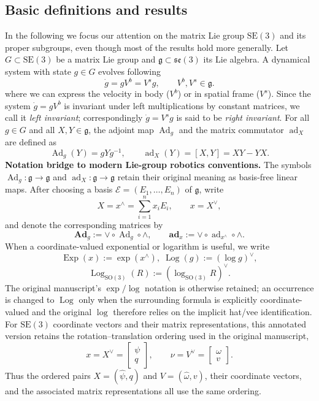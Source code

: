 \documentclass[10pt,twocolumn]{article}
\newenvironment{revision}{\color{red}}{}
\newcommand{\bAd}{\mathbf{Ad}}
\newcommand{\bad}{\mathbf{ad}}
\newcommand{\Exp}{\operatorname{Exp}}
\newcommand{\Log}{\operatorname{Log}}
\newcommand{\SO}{\mathrm{SO}}
\newcommand{\SE}{\mathrm{SE}}
\newcommand{\se}{\mathfrak{se}}
\newcommand{\gfrak}{\mathfrak g}
\newcommand{\Ad}{\operatorname{Ad}}
\newcommand{\ad}{\operatorname{ad}}
\begin{document}
\subsection{Basic definitions and results}\label{subsec:basic-definitions}
In the following we focus our attention on the matrix Lie group $\SE(3)$ and its proper subgroups, even though most of the results hold more generally. Let $G\subset\SE(3)$ be a matrix Lie group and $\gfrak\subset\se(3)$ its Lie algebra. A dynamical system with state $g\in G$ evolves following
\begin{equation*}
\dot g=gV^b=V^s g,\qquad V^b,V^s\in\gfrak.\tag{1}\label{eq:1}
\end{equation*}
where we can express the velocity in body ($V^b$) or in spatial frame ($V^s$). Since the system $\dot g=gV^b$ is invariant under left multiplications by constant matrices, we call it \emph{left invariant}; correspondingly $\dot g=V^s g$ is said to be \emph{right invariant}. For all $g\in G$ and all $X,Y\in\gfrak$, the adjoint map $\Ad_g$ and the matrix commutator $\ad_X$ are defined as
\begin{equation*}
\Ad_g(Y)=gYg^{-1},
\qquad
\ad_X(Y)=[X,Y]=XY-YX.
\end{equation*}
\begin{revision}
\noindent\textbf{Notation bridge to modern Lie-group robotics conventions.}
The symbols $\Ad_g:\gfrak\to\gfrak$ and $\ad_X:\gfrak\to\gfrak$ retain their original
meaning as basis-free linear maps.  After choosing a basis $\mathcal E=(E_1,\ldots,E_n)$ of
$\gfrak$, write
\[
X=x^\wedge=\sum_{i=1}^n x_iE_i,\qquad x=X^\vee,
\]
and denote the corresponding matrices by
\[
\bAd_g:=\vee\circ\Ad_g\circ\wedge,\qquad
\bad_x:=\vee\circ\ad_{x^\wedge}\circ\wedge.
\]
When a coordinate-valued exponential or logarithm is useful, we write
\[
\Exp(x):=\exp(x^\wedge),\; \Log(g):=(\log g)^\vee,
\]
\[
\Log_{\SO(3)}(R):=(\log_{\SO(3)}R)^\vee.
\]
The original manuscript's $\exp/\log$ notation is otherwise retained; an occurrence is
changed to $\Log$ only when the surrounding formula is explicitly coordinate-valued and the
original $\log$ therefore relies on the implicit hat/vee identification.  For $\SE(3)$ coordinate vectors and their matrix representations, this annotated version
retains the rotation--translation ordering used in the original manuscript,
\[
x=X^\vee=\begin{bmatrix}\psi\\q\end{bmatrix},\qquad
\nu=V^\vee=\begin{bmatrix}\omega\\v\end{bmatrix}.
\]
Thus the ordered pairs $X=(\widehat\psi,q)$ and $V=(\widehat\omega,v)$, their coordinate
vectors, and the associated matrix representations all use the same ordering.
\end{revision}
\end{document}
